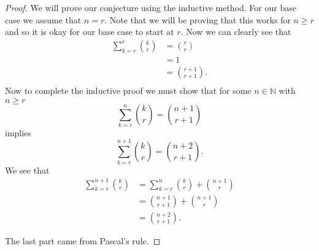 \documentclass[12pt]{article}
\begin{document}
\begin{proof}
We will prove our conjecture using the inductive method. For our base case we assume that $n = r.$ Note that we will be proving that this works for $n \geq r$ and so it is okay for our base case to start at $r$. Now we can clearly see that
\begin{align*}
\sum\limits_{k=r}^r\binom{k}{r} &= \binom{r}{r}\\
&=1\\
&=\binom{r+1}{r+1}.\\
\end{align*}
Now to complete the inductive proof we must show that for some $n\in \mathbb{N}$ with $n\geq r$
\[\sum\limits_{k=r}^n\binom{k}{r} = \binom{n+1}{r+1}\]
implies
\[\sum\limits_{k=r}^{n+1}\binom{k}{r} = \binom{n+2}{r+1}.\]
We see that
\begin{align*}
\sum\limits_{k=r}^{n+1}\binom{k}{r} &= \sum\limits_{k=r}^n\binom{k}{r}+\binom{n+1}{r}\\
&= \binom{n+1}{r+1} + \binom{n+1}{r}\\
&= \binom{n+2}{r+1}.
\end{align*}

The last part came from Pascal's rule.




\end{proof}
\end{document}
